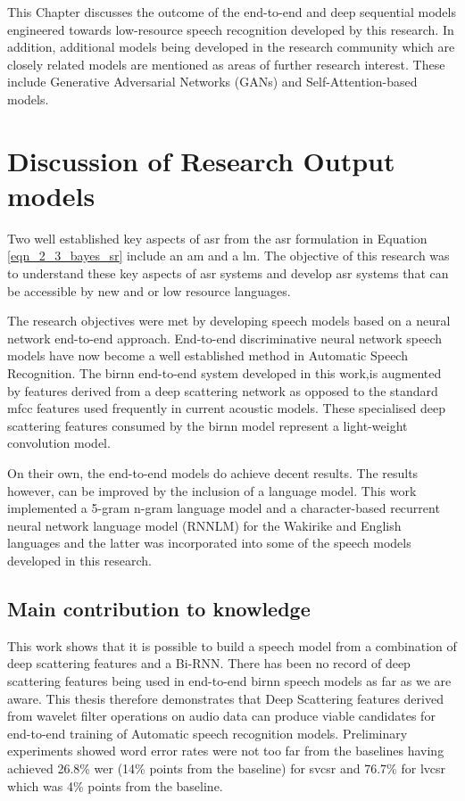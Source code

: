 This Chapter discusses the outcome of the end-to-end and deep sequential models engineered towards low-resource speech recognition developed by this research. In addition, additional models being developed in the research community which are closely related models are mentioned as areas of further research interest.  These include Generative Adversarial Networks (GANs) and Self-Attention-based models. 

\section{Discussion of Research Output models}

Two well established key aspects of \acrshort{asr} from the \acrshort{asr} formulation in Equation \ref{eqn_2_3_bayes_sr} include an \acrfull{am} and a \acrfull{lm}. The objective of this research was to understand these key aspects of \acrshort{asr} systems and develop \acrshort{asr} systems that can be accessible by new and or low resource languages.

The research objectives were met by developing speech models based on a neural network end-to-end approach. End-to-end discriminative neural network speech models have now become a well established method in Automatic Speech Recognition.   The \acrfull{birnn} end-to-end system developed in this work,is augmented by features derived from a deep scattering network as opposed to the standard \acrfull{mfcc} features used frequently in current acoustic models.  These specialised deep scattering features consumed by the \acrshort{birnn} model represent a light-weight convolution model. 

On their own, the end-to-end models do achieve decent results. The results however,  can be improved by the inclusion of a language model.  This work implemented a 5-gram n-gram language model and a character-based recurrent neural network language model (RNNLM) for the Wakirike and English languages and the latter was incorporated into some of the speech models developed in this research.

\subsection{Main contribution to knowledge}
This work shows that it is possible to build a speech model from a combination of deep scattering features and a Bi-RNN. There has been no record of deep scattering features being used in end-to-end \acrshort{birnn} speech models as far as we are aware.  This thesis therefore demonstrates that Deep Scattering features derived from wavelet filter operations on audio data can produce viable candidates for end-to-end training of Automatic speech recognition models.  Preliminary experiments showed word error rates were not too far from the baselines having achieved 26.8\% \acrshort{wer} (14\% points from the baseline) for \acrshort{svcsr} and 76.7\% for \acrshort{lvcsr} which was 4\% points from the baseline.

